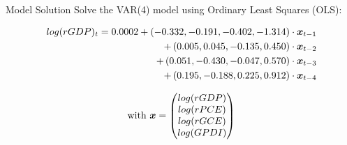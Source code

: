 \begin{frame}{Model Solution} 
    Solve the VAR(4) model using Ordinary Least Squares (OLS):
    
    \begin{align*}
        log(rGDP)_t =  0.0002 
        + \left( -0.332, -0.191, -0.402, -1.314 \right) \cdot \boldsymbol{x}_{t-1} \\
        + \left(  0.005,  0.045, -0.135,  0.450 \right) \cdot \boldsymbol{x}_{t-2} \\
        + \left(  0.051, -0.430, -0.047,  0.570 \right) \cdot \boldsymbol{x}_{t-3} \\
        + \left(  0.195, -0.188,  0.225,  0.912 \right) \cdot \boldsymbol{x}_{t-4}
    \end{align*}
    
    \[ \text{with } \boldsymbol{x} = \begin{pmatrix} log(rGDP) \\ log(rPCE) \\ log(rGCE) \\ log(GPDI) \end{pmatrix} \]
\end{frame}
    
